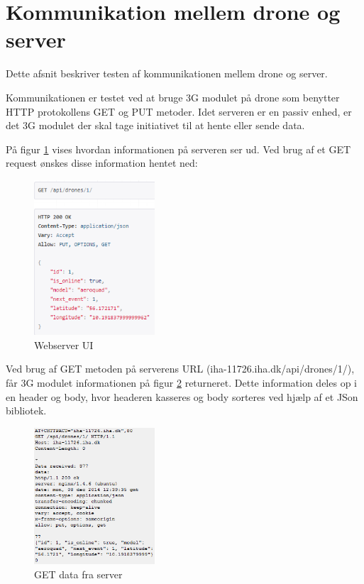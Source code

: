 \section{Kommunikation mellem drone og server}

Dette afsnit beskriver testen af kommunikationen mellem drone og server. 

Kommunikationen er testet ved at bruge 3G modulet på drone som benytter HTTP protokollens GET og PUT metoder. 
Idet serveren er en passiv enhed, er det 3G modulet der skal tage initiativet til at hente eller sende data. 

På figur \ref{fig:integrationstest_webserver} vises hvordan informationen på serveren ser ud. Ved brug af et GET request ønskes disse information hentet ned: 

\begin{figure}[H]
\centering
\includegraphics[width=0.4\textwidth]{Billeder/Test/integratest_webserver.png}
\caption{Webserver UI}
\label{fig:integrationstest_webserver}
\end{figure}

Ved brug af GET metoden på serverens URL (iha-11726.iha.dk/api/drones/1/), får 3G modulet informationen på figur \ref{fig:getfromserver} returneret. Dette information deles op i en header og body, hvor headeren kasseres og body sorteres ved hjælp af et JSon bibliotek.

\begin{figure}[H]
\centering
\includegraphics[width=0.4\textwidth]{Billeder/Test/getfromserver.png}
\caption{GET data fra server}
\label{fig:getfromserver}
\end{figure}

